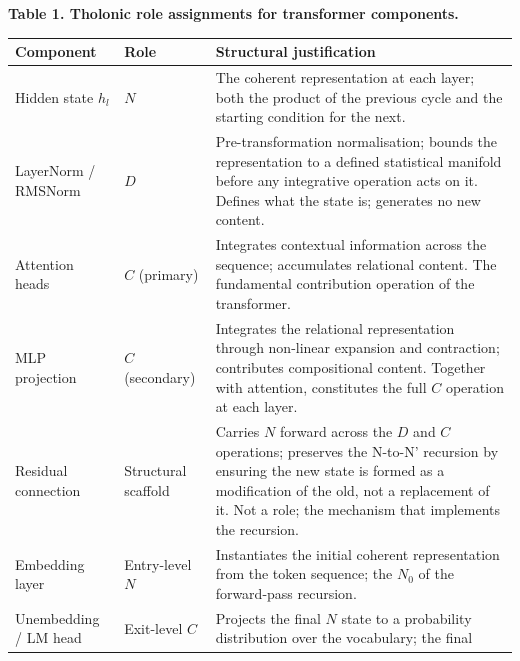 \documentclass[
  11pt,
  letterpaper,
]{article}
\begin{document}
\textbf{Table 1. Tholonic role assignments for transformer components.}

\begin{longtable}[]{@{}
  >{\raggedright\arraybackslash}p{}
  >{\raggedright\arraybackslash}p{}
  >{\raggedright\arraybackslash}p{}@{}}
\toprule\noalign{}
\begin{minipage}[b]{\linewidth}\raggedright
Component
\end{minipage} & \begin{minipage}[b]{\linewidth}\raggedright
Role
\end{minipage} & \begin{minipage}[b]{\linewidth}\raggedright
Structural justification
\end{minipage} \\
\midrule\noalign{}
\endhead
\bottomrule\noalign{}
\endlastfoot
Hidden state \(h_l\) & \(N\) & The coherent representation at each
layer; both the product of the previous cycle and the starting condition
for the next. \\
LayerNorm / RMSNorm & \(D\) & Pre-transformation normalisation; bounds
the representation to a defined statistical manifold before any
integrative operation acts on it. Defines what the state is; generates
no new content. \\
Attention heads & \(C\) (primary) & Integrates contextual information
across the sequence; accumulates relational content. The fundamental
contribution operation of the transformer. \\
MLP projection & \(C\) (secondary) & Integrates the relational
representation through non-linear expansion and contraction; contributes
compositional content. Together with attention, constitutes the full
\(C\) operation at each layer. \\
Residual connection & Structural scaffold & Carries \(N\) forward across
the \(D\) and \(C\) operations; preserves the N-to-N' recursion by
ensuring the new state is formed as a modification of the old, not a
replacement of it. Not a role; the mechanism that implements the
recursion. \\
Embedding layer & Entry-level \(N\) & Instantiates the initial coherent
representation from the token sequence; the \(N_0\) of the forward-pass
recursion. \\
Unembedding / LM head & Exit-level \(C\) & Projects the final \(N\)
state to a probability distribution over the vocabulary; the final

\end{longtable}
\end{document}

